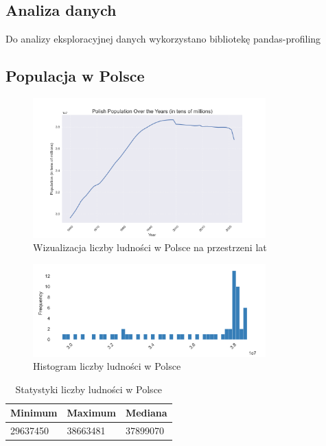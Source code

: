 \documentclass[11pt]{article}
\begin{document}
\subsection*{Analiza danych}
Do analizy eksploracyjnej danych wykorzystano bibliotekę pandas-profiling\cite{pp}
\subsection*{Populacja w Polsce}
\begin{figure}[H]
        \centering
        \includegraphics[width=0.8\textwidth]{polish_population_over_the_years.png}
        \caption{Wizualizacja liczby ludności w Polsce na przestrzeni lat}
\end{figure}
\begin{figure}[H]
        \centering
        \includegraphics[width=0.8\textwidth]{images/histogram_populacja.png}
        \caption{Histogram liczby ludności w Polsce}
\end{figure}
\begin{table}[H]
        \centering
        \begin{tabular}{|l|l|l|}
        \hline
        Minimum & Maximum & Mediana \\ \hline
        29637450 & 38663481 & 37899070 \\ \hline
        \end{tabular}
        \caption{Statystyki liczby ludności w Polsce}
        \end{table}
\end{document}
